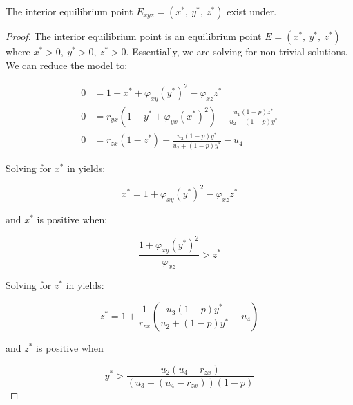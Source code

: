 \begin{theorem}\label{thm:eq-interior-exist}
    The interior equilibrium point $E_{xyz}=\left(x^*,\ y^*,\ z^*\right)$ exist under.
\end{theorem}
\begin{proof}
    The interior equilibrium point is an equilibrium point $E=\left(x^*,\ y^*,\ z^*\right)$ where $x^*>0,\ y^*>0,\ z^*>0$. Essentially, we are solving  for non-trivial solutions. We can reduce the model to:

    \begin{subequations}\label{system:interior}
        \begin{align}
            0 &= 1-x^*+\varphi_{xy}\left(y^*\right)^2-\varphi_{xz}z^* \label{eq:interior-x}\\
            0 &= r_{yx}\left(1-y^*+\varphi_{yx}\left(x^*\right)^2\right)-\frac{u_1\left(1-p\right)z^*}{u_2+\left(1-p\right)y^*} \label{eq:interior-y}\\
            0 &= r_{zx}\left(1-z^*\right)+\frac{u_3\left(1-p\right)y^*}{u_2+\left(1-p\right)y^*}-u_4 \label{eq:interior-z}
        \end{align}
    \end{subequations}

    Solving for $x^*$ in  yields:

    \begin{equation*}
        x^*=1+\varphi_{xy}\left(y^*\right)^2-\varphi_{xz}z^*
    \end{equation*}

    and $x^*$ is positive when:

    \begin{equation*}
        \frac{1+\varphi_{xy}\left(y^*\right)^2}{\varphi_{xz}}>z^*
    \end{equation*}

    Solving for $z^*$ in  yields:

    \begin{equation*}
        z^*=1+\frac{1}{r_{zx}}\left(\frac{u_3\left(1-p\right)y^*}{u_2+\left(1-p\right)y^*}-u_4\right)
    \end{equation*}
    
    and $z^*$ is positive when

    \begin{equation*}
        y^*>\frac{u_2\left(u_4-r_{zx}\right)}{\left(u_3-\left(u_4-r_{zx}\right)\right)\left(1-p\right)}
    \end{equation*}


\end{proof}
